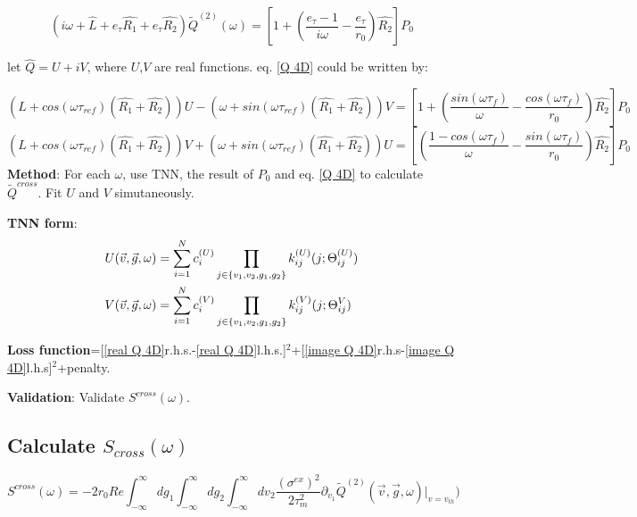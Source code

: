 \documentclass{article}
\begin{document}
	\begin{equation}
	(i\omega+\hat{L}+e_\tau\hat{R_1}+e_\tau\hat{R_2})\tilde{Q}^{(2)}(\omega)=[1+(\frac{e_\tau-1}{i\omega}-\frac{e_\tau}{r_0})\hat{R_2}]P_0
	\label{Q 4D}
    \end{equation}
    
    let $\hat{Q}=U+iV$, where $U$,$V$ are real functions. eq. \eqref{Q 4D} could be written by:
    
    \begin{equation}
    	(\hat{L}+cos(\omega\tau_{ref})(\hat{R_1}+\hat{R_2}))U-(\omega+sin(\omega\tau_{ref})(\hat{R_1}+\hat{R_2}))V=[1+(\frac{sin(\omega\tau_f)}{\omega}-\frac{cos(\omega\tau_f)}{r_0})\hat{R_2}]P_0
    	\label{real Q 4D}
    \end{equation}
    \begin{equation}
    	(\hat{L}+cos(\omega\tau_{ref})(\hat{R_1}+\hat{R_2}))V+(\omega+sin(\omega\tau_{ref})(\hat{R_1}+\hat{R_2}))U=[(\frac{1-cos(\omega\tau_f)}{\omega}-\frac{sin(\omega\tau_f)}{r_0})\hat{R_2}]P_0
    	\label{image Q 4D}
    \end{equation}
        \textbf{Method}: For each $\omega$, use TNN, the result of $P_0$ and eq. \eqref{Q 4D} to calculate $\tilde{Q}^{cross}$. Fit $U$ and $V$ simutaneously. 
    
    \textbf{TNN form}:
    \begin{align} 		        U(\vec{v},\vec{g},\omega)&=\sum_{i=1}^{N}c_i^{(U)}\prod_{j\in\{v_1,v_2,g_1,g_2\}}k_{ij}^{(U)}(j;\Theta_{ij}^{(U)})\notag\\
		V(\vec{v},\vec{g},\omega)&=\sum_{i=1}^{N}c_i^{(V)}\prod_{j\in\{v_1,v_2,g_1,g_2\}}k_{ij}^{(V)}(j;\Theta_{ij}^{V})
	\end{align}
    
    \textbf{Loss function}=[\eqref{real Q 4D}r.h.s.-\eqref{real Q 4D}l.h.s.]$^2$+[\eqref{image Q 4D}r.h.s-\eqref{image Q 4D}l.h.s]$^2$+penalty.
    
    \textbf{Validation}: Validate $S^{cross}(\omega)$.
    
	\subsection{Calculate $S_{cross}(\omega)$}
		\begin{equation}
		S^{cross}(\omega)=-2r_0Re\int_{-\infty}^{\infty}dg_1\int_{-\infty}^{\infty}dg_2\int_{-\infty}^{\infty}dv_2\frac{(\sigma^{ex})^2}{2\tau_m^2}\partial_{v_1}\tilde{Q}^{(2)}(\vec{v},\vec{g},\omega)|_{v=v_{th}})	
		\label{S cross}
	\end{equation}
	
\end{document}
